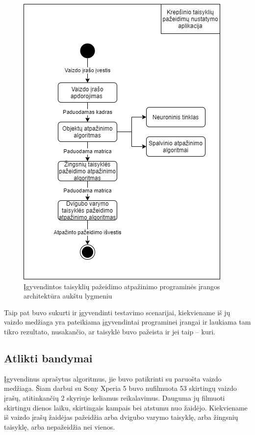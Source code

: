 \documentclass{VUMIFPSbakalaurinis}
\begin{document}
\begin{figure}[H]
	\centering
	\includegraphics[scale=0.6]{img/program_architecture}
	\caption{Įgyvendintos taisyklių pažeidimo atpažinimo programinės įrangos architektūra aukštu lygmeniu}
	\label{img:program_architecture}
\end{figure}

Taip pat buvo sukurti ir įgyvendinti testavimo scenarijai, kiekviename iš jų vaizdo medžiaga yra pateikiama įgyvendintai programinei įrangai ir laukiama tam tikro rezultato, nusakančio, ar taisyklė buvo pažeista ir jei taip – kuri.  

\subsection{Atlikti bandymai}
Įgyvendinus aprašytus algoritmus, jie buvo patikrinti su paruošta vaizdo medžiaga. Šiam darbui su Sony Xperia 5 buvo nufilmuota 53 skirtingų vaizdo įrašų, atitinkančių 2 skyriuje keliamus reikalavimus. Dauguma jų filmuoti skirtingu dienos laiku, skirtingais kampais bei atstumu nuo žaidėjo. Kiekviename iš vaizdo įrašų žaidėjas pažeidžia arba dvigubo varymo taisyklę, arba žingsnių taisyklę, arba nepažeidžia nei vienos.  
\end{document}
